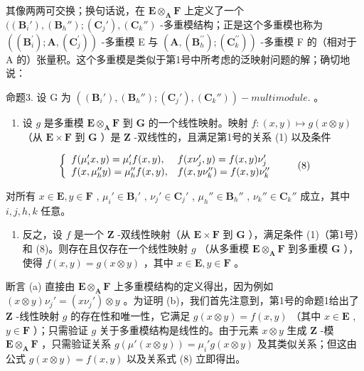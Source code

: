 其像两两可交换；换句话说，在 \(\mathbf{E} \otimes_{\mathbf{A}} \mathbf{F}\) 上定义了一个 \(((\mathbf{B}_i'), (\mathbf{B}_h''); (\mathbf{C}_j'), (\mathbf{C}_k'')\) -多重模结构；正是这个多重模也称为 \(((\mathbf{B}_i^{\prime});\mathbf{A},(\mathbf{C}_j^{\prime}))\) -多重模 E 与 \((\mathbf{A},(\mathbf{B}_h^{\prime\prime});(\mathbf{C}_k^{\prime\prime}))\) -多重模 F 的（相对于 A 的）张量积。这个多重模是类似于第1号中所考虑的泛映射问题的解；确切地说：

命题3. 设 G 为 \(((\mathbf{B}_i'), (\mathbf{B}_h''); (\mathbf{C}_j'), (\mathbf{C}_k''))-multimodule.\) 。

\begin{enumerate}
\def\labelenumi{(\alph{enumi})}
\tightlist
\item
  设 \(g\) 是多重模 \(\mathbf{E} \otimes_{\mathbf{A}} \mathbf{F}\) 到 \(\mathbf{G}\) 的一个线性映射。映射 \(f: (x, y) \mapsto g(x \otimes y)\) （从 \(\mathbf{E} \times \mathbf{F}\) 到 \(\mathbf{G}\) ）是 \(\mathbf{Z}\) -双线性的，且满足第1号的关系 (1) 以及条件
\end{enumerate}

\[
\left\{ \begin{array}{l l} f (\mu_ {i} ^ {\prime} x, y) = \mu_ {i} ^ {\prime} f (x, y), & f (x \nu_ {j} ^ {\prime}, y) = f (x, y) \nu_ {j} ^ {\prime} \\ f (x, \mu_ {h} ^ {\prime \prime} y) = \mu_ {h} ^ {\prime \prime} f (x, y), & f (x, y \nu_ {k} ^ {\prime \prime}) = f (x, y) \nu_ {k} ^ {\prime \prime} \end{array} \right.\tag{8}
\]

对所有 \(x \in \mathbf{E}, y \in \mathbf{F}\) , \(\mu_i' \in \mathbf{B}_i'\) , \(\nu_j' \in \mathbf{C}_j'\) , \(\mu_h'' \in \mathbf{B}_h''\) , \(\nu_k'' \in \mathbf{C}_{k}''\) 成立，其中 \(i, j, h, k\) 任意。

\begin{enumerate}
\def\labelenumi{(\alph{enumi})}
\setcounter{enumi}{1}
\tightlist
\item
  反之，设 \(f\) 是一个 \(\mathbf{Z}\) -双线性映射（从 \(\mathbf{E} \times \mathbf{F}\) 到 \(\mathbf{G}\) ），满足条件 (1)（第1号）和 (8)。则存在且仅存在一个线性映射 \(g\) （从多重模 \(\mathbf{E} \otimes_{\mathbf{A}} \mathbf{F}\) 到多重模 \(\mathbf{G}\) ），使得 \(f(x, y) = g(x \otimes y)\) ，其中 \(x \in \mathbf{E}, y \in \mathbf{F}\) 。
\end{enumerate}

断言 (a) 直接由 \(\mathbf{E} \otimes_{\mathbf{A}} \mathbf{F}\) 上多重模结构的定义得出，因为例如 \((x \otimes y)\nu_j' = (x\nu_j') \otimes y\) 。为证明 (b)，我们首先注意到，第1号的命题1给出了 \(\mathbf{Z}\) -线性映射 \(g\) 的存在性和唯一性，它满足 \(g(x \otimes y) = f(x, y)\) （其中 \(x \in \mathbf{E}\) , \(y \in \mathbf{F}\) ）；只需验证 \(g\) 关于多重模结构是线性的。由于元素 \(x \otimes y\) 生成 \(\mathbf{Z}\) -模 \(\mathbf{E} \otimes_{\mathbf{A}} \mathbf{F}\) ，只需验证关系 \(g(\mu'(x \otimes y)) = \mu_i' g(x \otimes y)\) 及其类似关系；但这由公式 \(g(x \otimes y) = f(x, y)\) 以及关系式 (8) 立即得出。


